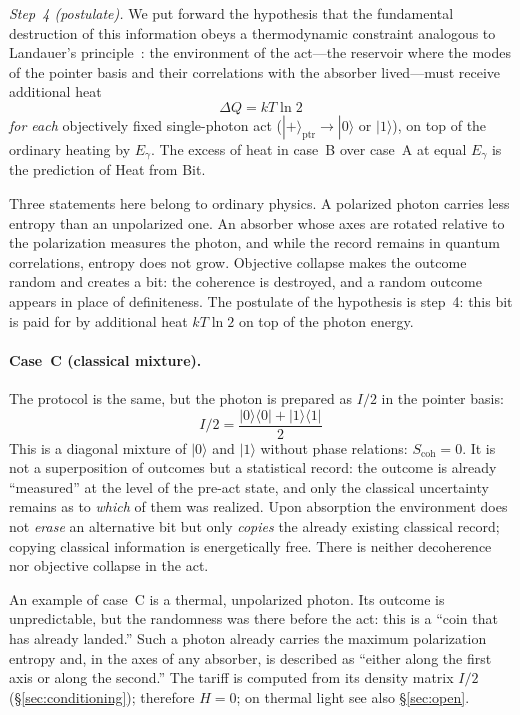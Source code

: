 \documentclass[11pt,a4paper]{article}
\newcommand{\Sref}[1]{\hyperref[#1]{\S\ref{#1}}}
\begin{document}
\emph{Step~4 (postulate).} We put forward the hypothesis that the fundamental destruction of this information obeys a thermodynamic constraint analogous to Landauer's principle~\cite{landauer1961}: the environment of the act---the reservoir where the modes of the pointer basis and their correlations with the absorber lived---must receive additional heat
\begin{equation}
\Delta Q = kT\ln 2
\end{equation}
\emph{for each} objectively fixed single-photon act ($|{+}\rangle_{\mathrm{ptr}}\to|0\rangle$ or $|1\rangle$), on top of the ordinary heating by $E_\gamma$. The excess of heat in case~B over case~A at equal $E_\gamma$ is the prediction of Heat from Bit.

Three statements here belong to ordinary physics. A polarized photon carries less entropy than an unpolarized one. An absorber whose axes are rotated relative to the polarization measures the photon, and while the record remains in quantum correlations, entropy does not grow. Objective collapse makes the outcome random and creates a bit: the coherence is destroyed, and a random outcome appears in place of definiteness. The postulate of the hypothesis is step~4: this bit is paid for by additional heat $kT\ln 2$ on top of the photon energy.

\paragraph{Case~C (classical mixture).}
The protocol is the same, but the photon is prepared as $I/2$ in the pointer basis:
\begin{equation}
I/2 = \frac{|0\rangle\langle 0| + |1\rangle\langle 1|}{2}
\end{equation}
This is a diagonal mixture of $|0\rangle$ and $|1\rangle$ without phase relations: $S_{\mathrm{coh}}=0$. It is not a superposition of outcomes but a statistical record: the outcome is already ``measured'' at the level of the pre-act state, and only the classical uncertainty remains as to \emph{which} of them was realized. Upon absorption the environment does not \emph{erase} an alternative bit but only \emph{copies} the already existing classical record; copying classical information is energetically free. There is neither decoherence nor objective collapse in the act.

An example of case~C is a thermal, unpolarized photon. Its outcome is unpredictable, but the randomness was there before the act: this is a ``coin that has already landed.'' Such a photon already carries the maximum polarization entropy and, in the axes of any absorber, is described as ``either along the first axis or along the second.'' The tariff is computed from its density matrix $I/2$ (\Sref{sec:conditioning}); therefore $H=0$; on thermal light see also \Sref{sec:open}.
\end{document}
